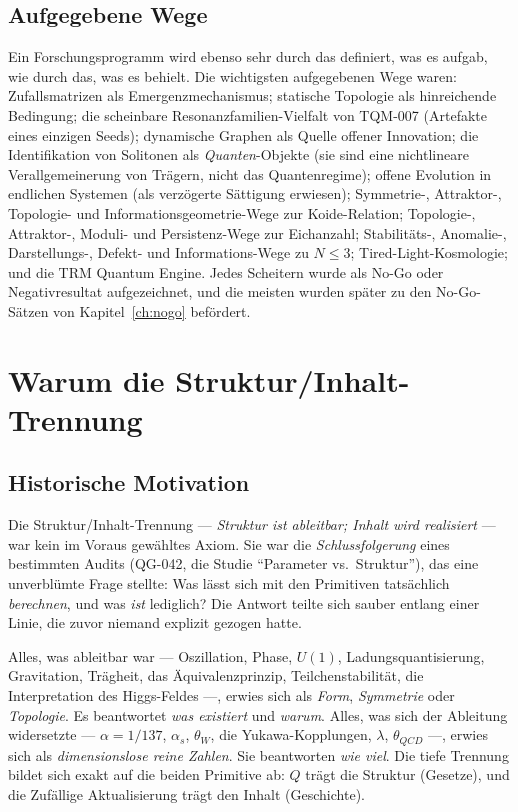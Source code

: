 \documentclass[10pt,twoside,openany]{book}
\begin{document}
\section{Aufgegebene Wege}

Ein Forschungsprogramm wird ebenso sehr durch das definiert, was es aufgab, wie durch das,
was es behielt. Die wichtigsten aufgegebenen Wege waren: Zufallsmatrizen als
Emergenzmechanismus; statische Topologie als hinreichende Bedingung; die scheinbare
Resonanzfamilien-Vielfalt von TQM-007 (Artefakte eines einzigen Seeds); dynamische Graphen
als Quelle offener Innovation; die Identifikation von Solitonen als \emph{Quanten}-Objekte
(sie sind eine nichtlineare Verallgemeinerung von Trägern, nicht das Quantenregime); offene
Evolution in endlichen Systemen (als verzögerte Sättigung erwiesen); Symmetrie-, Attraktor-,
Topologie- und Informationsgeometrie-Wege zur Koide-Relation; Topologie-, Attraktor-,
Moduli- und Persistenz-Wege zur Eichanzahl; Stabilitäts-, Anomalie-, Darstellungs-, Defekt-
und Informations-Wege zu $N\le3$; Tired-Light-Kosmologie; und die TRM Quantum Engine.
Jedes Scheitern wurde als No-Go oder Negativresultat aufgezeichnet, und die meisten wurden
später zu den No-Go-Sätzen von Kapitel~\ref{ch:nogo} befördert.

\chapter{Warum die Struktur/Inhalt-Trennung}
\label{ch:split}

\section{Historische Motivation}

Die Struktur/Inhalt-Trennung --- \emph{Struktur ist ableitbar; Inhalt wird realisiert} ---
war kein im Voraus gewähltes Axiom. Sie war die \emph{Schlussfolgerung} eines bestimmten
Audits (QG-042, die Studie ``Parameter vs.\ Struktur''), das eine unverblümte Frage
stellte: Was lässt sich mit den Primitiven tatsächlich \emph{berechnen}, und was
\emph{ist} lediglich? Die Antwort teilte sich sauber entlang einer Linie, die zuvor
niemand explizit gezogen hatte.

Alles, was ableitbar war --- Oszillation, Phase, $U(1)$, Ladungsquantisierung,
Gravitation, Trägheit, das Äquivalenzprinzip, Teilchenstabilität, die Interpretation des
Higgs-Feldes ---, erwies sich als \emph{Form}, \emph{Symmetrie} oder \emph{Topologie}. Es
beantwortet \emph{was existiert} und \emph{warum}. Alles, was sich der Ableitung
widersetzte --- $\alpha=1/137$, $\alpha_s$, $\theta_W$, die Yukawa-Kopplungen, $\lambda$,
$\theta_{QCD}$ ---, erwies sich als \emph{dimensionslose reine Zahlen}. Sie beantworten
\emph{wie viel}. Die tiefe Trennung bildet sich exakt auf die beiden Primitive ab: $Q$
trägt die Struktur (Gesetze), und die Zufällige Aktualisierung trägt den Inhalt
(Geschichte).
\end{document}
